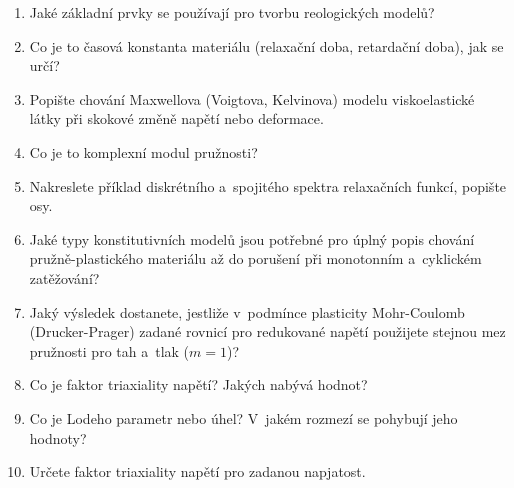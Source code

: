 \begin{enumerate}
	\item Jaké základní prvky se používají pro tvorbu reologických modelů?
	\item Co je to časová konstanta materiálu (relaxační doba, retardační doba), jak se určí?
	\item Popište chování Maxwellova (Voigtova, Kelvinova) modelu viskoelastické látky při skokové změně napětí nebo deformace.
	\item Co je to komplexní modul pružnosti?
	\item Nakreslete příklad diskrétního a~spojitého spektra relaxačních funkcí, popište osy.
	\item Jaké typy konstitutivních modelů jsou potřebné pro úplný popis chování pružně-plastického materiálu až do porušení při monotonním a~cyklickém zatěžování?
	\item Jaký výsledek dostanete, jestliže v~podmínce plasticity Mohr-Coulomb (Drucker-Prager) zadané rovnicí pro redukované napětí použijete stejnou mez pružnosti pro tah a~tlak ($m=1$)?
	\item Co je faktor triaxiality napětí? Jakých nabývá hodnot?
	\item Co je Lodeho parametr nebo úhel? V~jakém rozmezí se pohybují jeho hodnoty?
	\item Určete faktor triaxiality napětí pro zadanou napjatost.
\end{enumerate}

